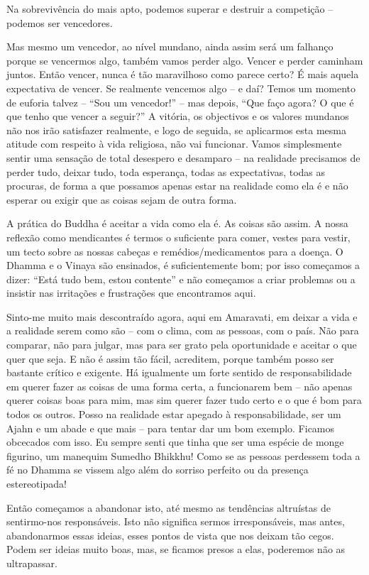 Na sobrevivência do mais apto, podemos superar e destruir a competição --
podemos ser vencedores.

Mas mesmo um vencedor, ao nível mundano, ainda assim será um falhanço porque se
vencermos algo, também vamos perder algo. Vencer e perder caminham juntos. Então
vencer, nunca é tão maravilhoso como parece certo? É mais aquela expectativa de
vencer. Se realmente vencemos algo -- e daí? Temos um momento de euforia talvez
-- ``Sou um vencedor!'' -- mas depois, ``Que faço agora? O que é que tenho que
vencer a seguir?'' A vitória, os objectivos e os valores mundanos não nos irão
satisfazer realmente, e logo de seguida, se aplicarmos esta mesma atitude com
respeito à vida religiosa, não vai funcionar. Vamos simplesmente sentir uma
sensação de total desespero e desamparo -- na realidade precisamos de perder
tudo, deixar tudo, toda esperança, todas as expectativas, todas as procuras, de
forma a que possamos apenas estar na realidade como ela é e não esperar ou
exigir que as coisas sejam de outra forma.

A prática do Buddha é aceitar a vida como ela é. As coisas são assim. A nossa
reflexão como mendicantes é termos o suficiente para comer, vestes para vestir,
um tecto sobre as nossas cabeças e remédios/medicamentos para a doença. O Dhamma
e o Vinaya são ensinados, é suficientemente bom; por isso começamos a dizer:
``Está tudo bem, estou contente'' e não começamos a criar problemas ou a
insistir nas irritações e frustrações que encontramos aqui.

Sinto-me muito mais descontraído agora, aqui em Amaravati, em deixar a vida e a
realidade serem como são -- com o clima, com as pessoas, com o país. Não para
comparar, não para julgar, mas para ser grato pela oportunidade e aceitar o que
quer que seja. E não é assim tão fácil, acreditem, porque também posso ser
bastante crítico e exigente. Há igualmente um forte sentido de responsabilidade
em querer fazer as coisas de uma forma certa, a funcionarem bem -- não apenas
querer coisas boas para mim, mas sim querer fazer tudo certo e o que é bom para
todos os outros. Posso na realidade estar apegado à responsabilidade, ser um
Ajahn e um abade e que mais -- para tentar dar um bom exemplo. Ficamos obcecados
com isso. Eu sempre senti que tinha que ser uma espécie de monge figurino, um
manequim Sumedho Bhikkhu! Como se as pessoas perdessem toda a fé no Dhamma se
vissem algo além do sorriso perfeito ou da presença estereotipada!

Então começamos a abandonar isto, até mesmo as tendências altruístas de
sentirmo-nos responsáveis. Isto não significa sermos irresponsáveis, mas antes,
abandonarmos essas ideias, esses pontos de vista que nos deixam tão cegos. Podem
ser ideias muito boas, mas, se ficamos presos a elas, poderemos não as
ultrapassar.


